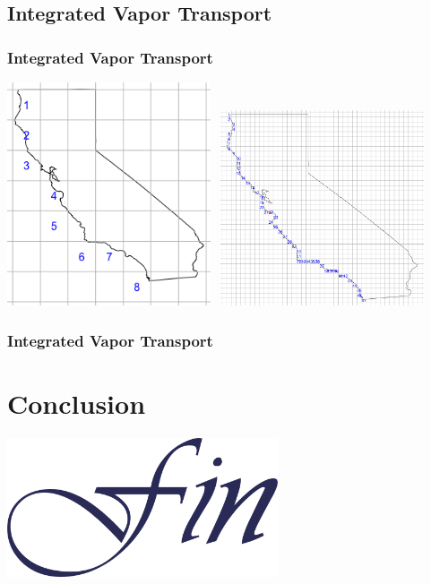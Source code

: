 \documentclass[aspectratio=169]{beamer}
\begin{document}
\subsection{Integrated Vapor Transport}
\begin{frame}
  \frametitle{Integrated Vapor Transport}
  \begin{center}
    \includegraphics[width=0.45\textwidth]{./images/grid_8}~
    \hfill
    \includegraphics[width=0.45\textwidth]{./images/grid_47}~
  \end{center}
\end{frame}

\begin{frame}
  \frametitle{Integrated Vapor Transport}
  \begin{center}
    
  \end{center}
\end{frame}

\section{Conclusion}

\begin{frame}
  \begin{center}
    \includegraphics[width=0.6\textwidth]{./images/fin}
  \end{center}
\end{frame}
\end{document}

